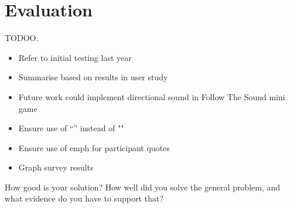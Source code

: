 \documentclass{l4proj}
\begin{document}




\chapter{Evaluation} 

TODOO:
\begin{itemize}
    \item Refer to initial testing last year
    \item Summarise based on results in user study
    \item Future work could implement directional sound in Follow The Sound mini game
    \item Ensure use of “” instead of ""
    \item Ensure use of emph for participant quotes
    \item Graph survey results
    
\end{itemize}

How good is your solution? How well did you solve the general problem, and what evidence do you have to support that?
\end{document}
